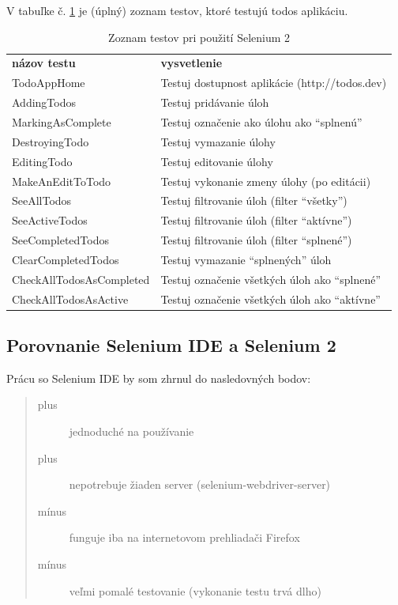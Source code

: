 V tabuľke č. \ref{table:test-list-selenium-2} je (úplný) zoznam testov, ktoré testujú todos aplikáciu.
\begin{table}[h]
\centering
\caption{Zoznam testov pri použití Selenium 2}
\label{table:test-list-selenium-2}
\begin{tabular}{ll}
\textbf{názov testu}     & \textbf{vysvetlenie}                           \\
TodoAppHome              & Testuj dostupnost aplikácie (http://todos.dev) \\
AddingTodos              & Testuj pridávanie úloh                         \\
MarkingAsComplete        & Testuj označenie ako úlohu ako ``splnenú''     \\
DestroyingTodo           & Testuj vymazanie úlohy                         \\
EditingTodo              & Testuj editovanie úlohy                        \\
MakeAnEditToTodo         & Testuj vykonanie zmeny úlohy (po editácii)     \\
SeeAllTodos              & Testuj filtrovanie úloh (filter ``všetky'')    \\
SeeActiveTodos           & Testuj filtrovanie úloh (filter ``aktívne'')   \\
SeeCompletedTodos        & Testuj filtrovanie úloh (filter ``splnené'')   \\
ClearCompletedTodos      & Testuj vymazanie ``splnených'' úloh            \\
CheckAllTodosAsCompleted & Testuj označenie všetkých úloh ako ``splnené'' \\
CheckAllTodosAsActive    & Testuj označenie všetkých úloh ako ``aktívne''             
\end{tabular}
\end{table}
\subsection{Porovnanie Selenium IDE a Selenium 2}
\noindent Prácu so Selenium IDE by som zhrnul do nasledovných bodov:
\begin{quote}
\begin{description}
\item[plus] jednoduché na používanie
\item[plus] nepotrebuje žiaden server (selenium-webdriver-server)
\item[mínus] funguje iba na internetovom prehliadači Firefox
\item[mínus] veľmi pomalé testovanie (vykonanie testu trvá dlho)
\end{description}
\end{quote}

